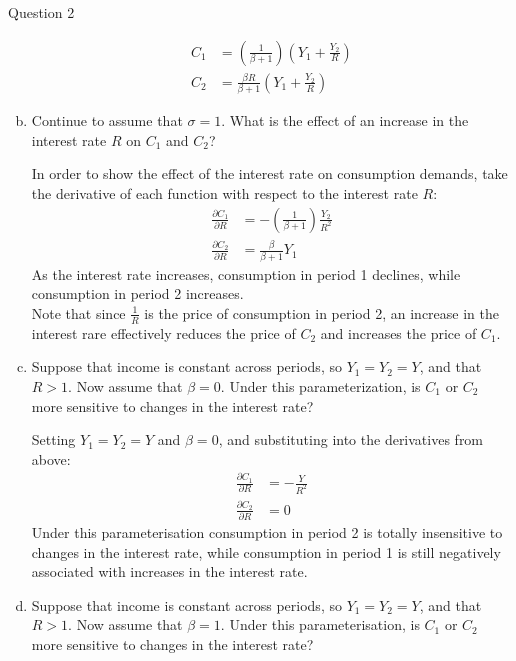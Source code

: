 \documentclass[a4paper]{article}
\begin{document}
\begin{questionbox}{Question 2}
\begin{enumerate}[(a)]
\begin{explanationbox}
\begin{align*}
					C_1 &= \left( \frac{1}{\beta + 1} \right) \left( Y_1 + \frac{Y_2}{R} \right)\\
					C_2 &= \frac{\beta R}{\beta + 1} \left( Y_1 + \frac{Y_2}{R} \right)
				\end{align*}
			\end{explanationbox}\pagebreak
			\item Continue to assume that \( \sigma = 1 \). What is the effect of an increase in the interest rate \( R \) on \( C_1 \) and \( C_2 \)?
			\begin{explanationbox}
				In order to show the effect of the interest rate on consumption demands, take the derivative of each function with respect to the interest rate \( R \):
				\begin{align*}
					\frac{\partial C_1}{\partial R} &= -\left( \frac{1}{\beta + 1} \right) \frac{Y_2}{R^2}\\
					\frac{\partial C_2}{\partial R} &= \frac{\beta}{\beta + 1} Y_1
				\end{align*}
				As the interest rate increases, consumption in period 1 declines, while consumption in period 2 increases.\\
				Note that since \( \frac{1}{R} \) is the price of consumption in period 2, an increase in the interest rare effectively reduces the price of \( C_2 \) and increases the price of \( C_1 \).
			\end{explanationbox}
			\item Suppose that income is constant across periods, so \( Y_1 = Y_2 = Y \), and that \( R > 1 \). Now assume that \( \beta = 0 \). Under this parameterization, is \( C_1 \) or \( C_2 \) more sensitive to changes in the interest rate?
			\begin{explanationbox}
				Setting \( Y_1 = Y_2 = Y \) and \( \beta = 0 \), and substituting into the derivatives from above:
				\begin{align*}
					\frac{\partial C_1}{\partial R} &= -\frac{Y}{R^2}\\
					\frac{\partial C_2}{\partial R} &= 0
				\end{align*}
				Under this parameterisation consumption in period 2 is totally insensitive to changes in the interest rate, while consumption in period 1 is still negatively associated with increases in the interest rate.
			\end{explanationbox}
			\item Suppose that income is constant across periods, so \( Y_1 = Y_2 = Y \), and that \( R > 1 \). Now assume that \( \beta = 1 \). Under this parameterisation, is \( C_1 \) or \( C_2 \) more sensitive to changes in the interest rate?

\end{enumerate}
\end{questionbox}
\end{document}
